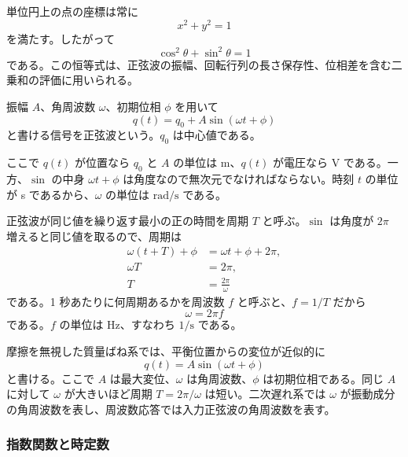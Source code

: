 単位円上の点の座標は常に
\begin{equation}
  x^2+y^2=1
\end{equation}
を満たす。したがって
\begin{equation}
  \cos^2\theta+\sin^2\theta=1
\end{equation}
である。この恒等式は、正弦波の振幅、回転行列の長さ保存性、位相差を含む二乗和の評価に用いられる。

\begin{definition}[正弦波]
振幅 $A$、角周波数 $\omega$、初期位相 $\phi$ を用いて
\begin{equation}
  q(t)=q_0+A\sin(\omega t+\phi)
\end{equation}
と書ける信号を正弦波という。$q_0$ は中心値である。
\end{definition}

ここで $q(t)$ が位置なら $q_0$ と $A$ の単位は m、$q(t)$ が電圧なら V である。一方、$\sin$ の中身 $\omega t+\phi$ は角度なので無次元でなければならない。時刻 $t$ の単位が s であるから、$\omega$ の単位は $\mathrm{rad/s}$ である。

正弦波が同じ値を繰り返す最小の正の時間を周期 $T$ と呼ぶ。$\sin$ は角度が $2\pi$ 増えると同じ値を取るので、周期は
\begin{align}
  \omega(t+T)+\phi&=\omega t+\phi+2\pi,\\
  \omega T&=2\pi,\\
  T&=\frac{2\pi}{\omega}
\end{align}
である。1 秒あたりに何周期あるかを周波数 $f$ と呼ぶと、$f=1/T$ だから
\begin{equation}
  \omega=2\pi f
\end{equation}
である。$f$ の単位は Hz、すなわち $1/\mathrm{s}$ である。

\begin{example}[質量ばねの変位]
摩擦を無視した質量ばね系では、平衡位置からの変位が近似的に
\begin{equation}
  q(t)=A\sin(\omega t+\phi)
\end{equation}
と書ける。ここで $A$ は最大変位、$\omega$ は角周波数、$\phi$ は初期位相である。同じ $A$ に対して $\omega$ が大きいほど周期 $T=2\pi/\omega$ は短い。二次遅れ系では $\omega$ が振動成分の角周波数を表し、周波数応答では入力正弦波の角周波数を表す。
\end{example}

\subsubsection{指数関数と時定数}

